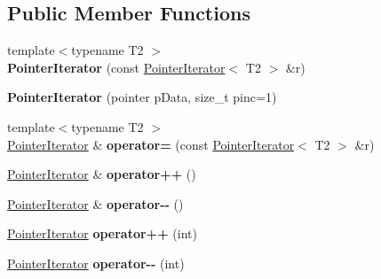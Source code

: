 \subsection*{Public Member Functions}
\begin{DoxyCompactItemize}
\item 
\hypertarget{classkeycpp_1_1_pointer_iterator_a8144990606b147959521783cc7a7934f}{{\footnotesize template$<$typename T2 $>$ }\\{\bfseries Pointer\-Iterator} (const \hyperlink{classkeycpp_1_1_pointer_iterator}{Pointer\-Iterator}$<$ T2 $>$ \&r)}\label{classkeycpp_1_1_pointer_iterator_a8144990606b147959521783cc7a7934f}

\item 
\hypertarget{classkeycpp_1_1_pointer_iterator_aa1a5f134d80ade0a24b6232f25d81a52}{{\bfseries Pointer\-Iterator} (pointer p\-Data, size\-\_\-t pinc=1)}\label{classkeycpp_1_1_pointer_iterator_aa1a5f134d80ade0a24b6232f25d81a52}

\item 
\hypertarget{classkeycpp_1_1_pointer_iterator_aac3906d9cdca051a792ef7899f78d47a}{{\footnotesize template$<$typename T2 $>$ }\\\hyperlink{classkeycpp_1_1_pointer_iterator}{Pointer\-Iterator} \& {\bfseries operator=} (const \hyperlink{classkeycpp_1_1_pointer_iterator}{Pointer\-Iterator}$<$ T2 $>$ \&r)}\label{classkeycpp_1_1_pointer_iterator_aac3906d9cdca051a792ef7899f78d47a}

\item 
\hypertarget{classkeycpp_1_1_pointer_iterator_adb5f11092924ec2ffdb0987221ac09f7}{\hyperlink{classkeycpp_1_1_pointer_iterator}{Pointer\-Iterator} \& {\bfseries operator++} ()}\label{classkeycpp_1_1_pointer_iterator_adb5f11092924ec2ffdb0987221ac09f7}

\item 
\hypertarget{classkeycpp_1_1_pointer_iterator_a8817b17c51afe87381ea2911386d2210}{\hyperlink{classkeycpp_1_1_pointer_iterator}{Pointer\-Iterator} \& {\bfseries operator-\/-\/} ()}\label{classkeycpp_1_1_pointer_iterator_a8817b17c51afe87381ea2911386d2210}

\item 
\hypertarget{classkeycpp_1_1_pointer_iterator_a84bfd964409dfdf89343cc9db3e996df}{\hyperlink{classkeycpp_1_1_pointer_iterator}{Pointer\-Iterator} {\bfseries operator++} (int)}\label{classkeycpp_1_1_pointer_iterator_a84bfd964409dfdf89343cc9db3e996df}

\item 
\hypertarget{classkeycpp_1_1_pointer_iterator_ac4da97a9c8c09ad6ee1d27f4eb27310f}{\hyperlink{classkeycpp_1_1_pointer_iterator}{Pointer\-Iterator} {\bfseries operator-\/-\/} (int)}\label{classkeycpp_1_1_pointer_iterator_ac4da97a9c8c09ad6ee1d27f4eb27310f}


\end{DoxyCompactItemize}
